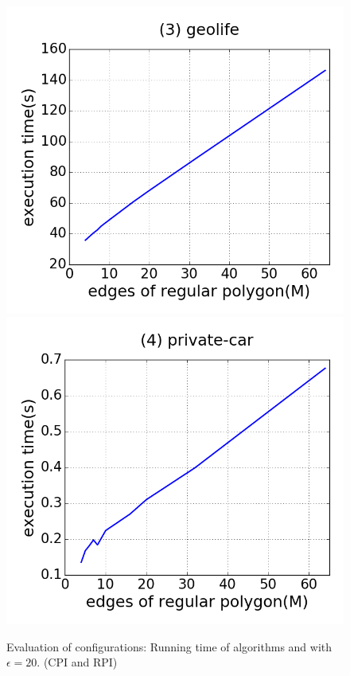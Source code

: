 \begin{figure}[tb!]
\includegraphics[scale = 0.250]{figures/Exp-M-time-geolife.png}
\includegraphics[scale = 0.250]{figures/Exp-M-time-private.png}
\vspace{-2ex}
\caption{\small Evaluation of configurations: Running time of algorithms \cist and \cista with $\epsilon = 20$. (CPI and RPI) }
\label{fig:m-time-e20}
\vspace{-1ex}
\end{figure}

